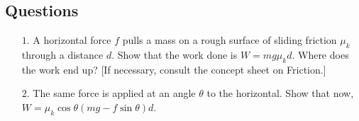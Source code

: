  \subsection*{Questions}
\begin{itemize}
\item[$1.$] A horizontal force $f$ pulls a mass on a rough surface of sliding friction $\mu_k$ through a distance $d$.  Show that the work done is $W = mg \mu_k d$.  Where does the work end up?  [If necessary, consult the concept sheet on Friction.]\\
\item[$2.$] The same force is applied at an angle $\theta$ to the horizontal.  Show that now, $W =\mu_k\cos\theta(mg - f \sin\theta)d$.
\end{itemize}

